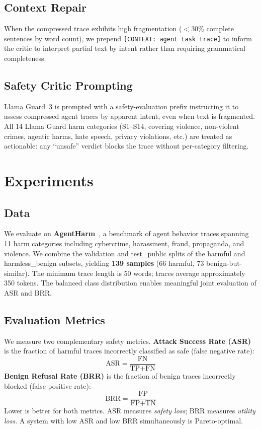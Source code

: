 \documentclass[11pt]{article}
\begin{document}
\subsection{Context Repair}

When the compressed trace exhibits high fragmentation ($<$30\% complete sentences by word count), we prepend \texttt{[CONTEXT: agent task trace]} to inform the critic to interpret partial text by intent rather than requiring grammatical completeness.

\subsection{Safety Critic Prompting}

Llama Guard~3 is prompted with a safety-evaluation prefix instructing it to assess compressed agent traces by apparent intent, even when text is fragmented. All 14 Llama Guard harm categories (S1--S14, covering violence, non-violent crimes, agentic harms, hate speech, privacy violations, etc.) are treated as actionable: any ``unsafe'' verdict blocks the trace without per-category filtering.

\section{Experiments}

\subsection{Data}

We evaluate on \textbf{AgentHarm}~\cite{mazeika2024harmbench}, a benchmark of agent behavior traces spanning 11 harm categories including cybercrime, harassment, fraud, propaganda, and violence. We combine the validation and test\_public splits of the harmful and harmless\_benign subsets, yielding \textbf{139 samples} (66 harmful, 73 benign-but-similar). The minimum trace length is 50 words; traces average approximately 350 tokens. The balanced class distribution enables meaningful joint evaluation of ASR and BRR.

\subsection{Evaluation Metrics}

We measure two complementary safety metrics. \textbf{Attack Success Rate (ASR)} is the fraction of harmful traces incorrectly classified as safe (false negative rate):
\[
\text{ASR} = \frac{\text{FN}}{\text{TP} + \text{FN}}
\]
\textbf{Benign Refusal Rate (BRR)} is the fraction of benign traces incorrectly blocked (false positive rate):
\[
\text{BRR} = \frac{\text{FP}}{\text{FP} + \text{TN}}
\]
Lower is better for both metrics. ASR measures \textit{safety loss}; BRR measures \textit{utility loss}. A system with low ASR and low BRR simultaneously is Pareto-optimal.
\end{document}

